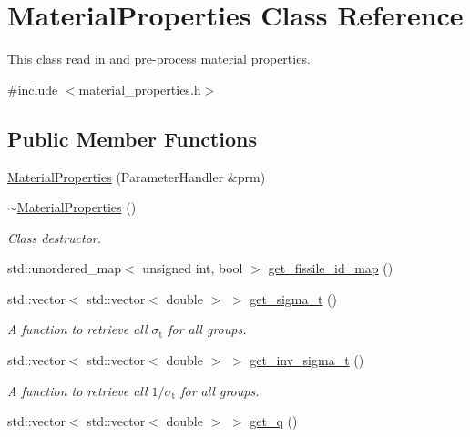 \hypertarget{class_material_properties}{}\section{Material\+Properties Class Reference}
\label{class_material_properties}


This class read in and pre-\/process material properties.  




{\ttfamily \#include $<$material\+\_\+properties.\+h$>$}

\subsection*{Public Member Functions}
\begin{DoxyCompactItemize}
\item 
\hyperlink{class_material_properties_a9c1a2ff5f7cfaacd4b992e96186fbf81}{Material\+Properties} (Parameter\+Handler \&prm)
\item 
\hyperlink{class_material_properties_aab94335e9db402f624b88603b233bcab}{$\sim$\+Material\+Properties} ()
\begin{DoxyCompactList}\small\item\em Class destructor. \end{DoxyCompactList}\item 
std\+::unordered\+\_\+map$<$ unsigned int, bool $>$ \hyperlink{class_material_properties_ae04d6676e685d374cb82a15a6b45d96b}{get\+\_\+fissile\+\_\+id\+\_\+map} ()
\item 
std\+::vector$<$ std\+::vector$<$ double $>$ $>$ \hyperlink{class_material_properties_ada6ea8094dfc4b5c9610c6dc8d54a47a}{get\+\_\+sigma\+\_\+t} ()
\begin{DoxyCompactList}\small\item\em A function to retrieve all $\sigma_\mathrm{t}$ for all groups. \end{DoxyCompactList}\item 
std\+::vector$<$ std\+::vector$<$ double $>$ $>$ \hyperlink{class_material_properties_a319b2dd1caaa13cc9b1afc9ace17e218}{get\+\_\+inv\+\_\+sigma\+\_\+t} ()
\begin{DoxyCompactList}\small\item\em A function to retrieve all $1/\sigma_\mathrm{t}$ for all groups. \end{DoxyCompactList}\item 
std\+::vector$<$ std\+::vector$<$ double $>$ $>$ \hyperlink{class_material_properties_a0bbf8a7d69c73288b015b4247ab0451c}{get\+\_\+q} ()

\end{DoxyCompactItemize}
